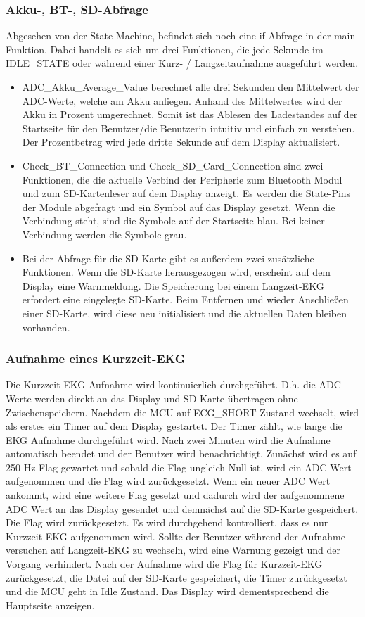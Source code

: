 \subsubsection{Akku-, BT-, SD-Abfrage}

Abgesehen von der State Machine, befindet sich noch eine if-Abfrage in der main Funktion. Dabei handelt es sich um drei Funktionen, die jede Sekunde im IDLE\_STATE oder während einer Kurz- / Langzeitaufnahme ausgeführt werden.
\begin{itemize}
    \item ADC\_Akku\_Average\_Value berechnet alle drei Sekunden den Mittelwert der ADC-Werte, welche am Akku anliegen. Anhand des Mittelwertes wird der Akku in Prozent umgerechnet. Somit ist das Ablesen des Ladestandes auf der Startseite für den Benutzer/die Benutzerin intuitiv und einfach zu verstehen.
    Der Prozentbetrag wird jede dritte Sekunde auf dem Display aktualisiert.
    \item Check\_BT\_Connection und Check\_SD\_Card\_Connection sind zwei Funktionen, die die aktuelle Verbind der Peripherie zum Bluetooth Modul und zum SD-Kartenleser auf dem Display anzeigt. Es werden die State-Pins der Module abgefragt und ein Symbol auf das Display gesetzt. Wenn die Verbindung steht, sind die Symbole auf der Startseite blau. Bei keiner Verbindung werden die Symbole grau.
    \item Bei der Abfrage für die SD-Karte gibt es außerdem zwei zusätzliche Funktionen. Wenn die SD-Karte herausgezogen wird, erscheint auf dem Display eine Warnmeldung. Die Speicherung bei einem Langzeit-EKG erfordert eine eingelegte SD-Karte. Beim Entfernen und wieder Anschließen einer SD-Karte, wird diese neu initialisiert und die aktuellen Daten bleiben vorhanden.
\end{itemize}

\subsubsection{Aufnahme eines Kurzzeit-EKG}

Die Kurzzeit-EKG Aufnahme wird kontinuierlich durchgeführt. D.h. die ADC Werte werden direkt an das Display und SD-Karte übertragen ohne Zwischenspeichern. Nachdem die MCU auf ECG\_SHORT Zustand wechselt, wird als erstes ein Timer auf dem Display gestartet. Der Timer zählt, wie lange die EKG Aufnahme durchgeführt wird. Nach zwei Minuten wird die Aufnahme automatisch beendet und der Benutzer wird benachrichtigt. Zunächst wird es auf 250 Hz Flag gewartet und sobald die Flag ungleich Null ist, wird ein ADC Wert aufgenommen und die Flag wird zurückgesetzt. Wenn ein neuer ADC Wert ankommt, wird eine weitere Flag gesetzt und dadurch wird der aufgenommene ADC Wert an das Display gesendet und demnächst auf die SD-Karte gespeichert. Die Flag wird zurückgesetzt.
Es wird durchgehend kontrolliert, dass es nur Kurzzeit-EKG aufgenommen wird. Sollte der Benutzer während der Aufnahme versuchen auf Langzeit-EKG zu wechseln, wird eine Warnung gezeigt und der Vorgang verhindert.
Nach der Aufnahme wird die Flag für Kurzzeit-EKG zurückgesetzt, die Datei auf der SD-Karte gespeichert, die Timer zurückgesetzt und die MCU geht in Idle Zustand. Das Display wird dementsprechend die Hauptseite anzeigen.

